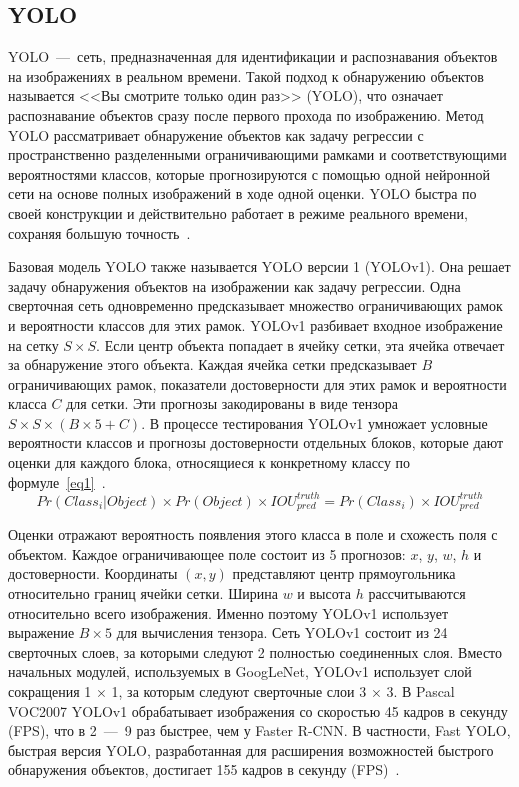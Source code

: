 \subsection{YOLO}

YOLO~---~сеть, предназначенная для идентификации и распознавания объектов на изображениях в реальном времени.
Такой подход к обнаружению объектов называется <<Вы смотрите только один раз>> (YOLO), что означает распознавание объектов сразу после первого прохода по изображению.
Метод YOLO рассматривает обнаружение объектов как задачу регрессии с пространственно разделенными ограничивающими рамками и соответствующими вероятностями классов, которые прогнозируются с помощью одной нейронной сети на основе полных изображений в ходе одной оценки.
YOLO быстра по своей конструкции и действительно работает в режиме реального времени, сохраняя большую точность~\cite{base, all}.

Базовая модель YOLO также называется YOLO версии 1 (YOLOv1).
Она решает задачу обнаружения объектов на изображении как задачу регрессии.
Одна сверточная сеть одновременно предсказывает множество ограничивающих рамок и вероятности классов для этих рамок.
YOLOv1 разбивает входное изображение на сетку $S \times S$.
Если центр объекта попадает в ячейку сетки, эта ячейка отвечает за обнаружение этого объекта.
Каждая ячейка сетки предсказывает $B$ ограничивающих рамок, показатели достоверности для этих рамок и вероятности класса $C$ для сетки.
Эти прогнозы закодированы в виде тензора $S \times S \times (B \times 5 + C)$.
В процессе тестирования YOLOv1 умножает условные вероятности классов и прогнозы достоверности отдельных блоков, которые дают оценки для каждого блока, относящиеся к конкретному классу по формуле~\ref{eq1}~\cite{all}.
\begin{equation}
	\label{eq1}
	Pr(Class_{i} | Object) \times Pr(Object) \times IOU^{truth}_{pred} = Pr(Class_{i}) \times IOU^{truth}_{pred}
\end{equation}

Оценки отражают вероятность появления этого класса в поле и схожесть поля с объектом.
Каждое ограничивающее поле состоит из 5 прогнозов: $x$, $y$, $w$, $h$ и достоверности.
Координаты $(x, y)$ представляют центр прямоугольника относительно границ ячейки сетки.
Ширина $w$ и высота $h$ рассчитываются относительно всего изображения.
Именно поэтому YOLOv1 использует выражение $B \times 5$ для вычисления тензора.
Сеть YOLOv1 состоит из 24 сверточных слоев, за которыми следуют 2 полностью соединенных слоя.
Вместо начальных модулей, используемых в GoogLeNet, YOLOv1 использует слой сокращения 1 $\times$ 1, за которым следуют сверточные слои 3 $\times$ 3.
В Pascal VOC2007 YOLOv1 обрабатывает изображения со скоростью 45 кадров в секунду (FPS), что в 2~---~9 раз быстрее, чем у Faster R-CNN.
В частности, Fast YOLO, быстрая версия YOLO, разработанная для расширения возможностей быстрого обнаружения объектов, достигает 155 кадров в секунду (FPS)~\cite{base, all}.

